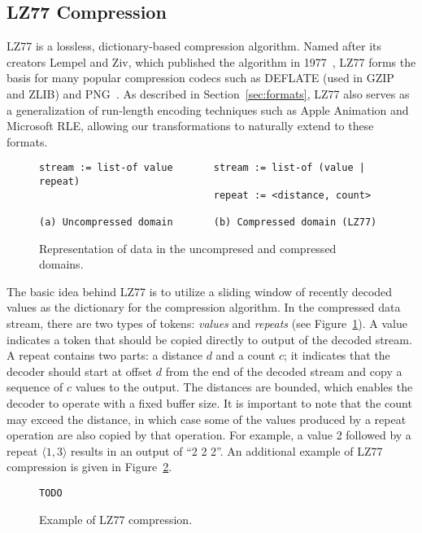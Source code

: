 \subsection{LZ77 Compression}

LZ77 is a lossless, dictionary-based compression algorithm.  Named
after its creators Lempel and Ziv, which published the algorithm in
1977~\cite{lz77}, LZ77 forms the basis for many popular compression
codecs such as DEFLATE\cite{deflate} (used in GZIP\cite{gzip} and
ZLIB\cite{zlib}) and PNG~\cite{png}.  As described in
Section~\ref{sec:formats}, LZ77 also serves as a generalization of
run-length encoding techniques such as Apple Animation and Microsoft
RLE, allowing our transformations to naturally extend to these
formats.

\begin{figure}[t]
\scriptsize
\begin{verbatim}
stream := list-of value       stream := list-of (value | repeat)
                              repeat := <distance, count>

(a) Uncompressed domain       (b) Compressed domain (LZ77)
\end{verbatim}
\caption{Representation of data in the uncompresed and compressed
domains.  \protect\label{fig:domains}}
\end{figure}

The basic idea behind LZ77 is to utilize a sliding window of recently
decoded values as the dictionary for the compression algorithm.  In
the compressed data stream, there are two types of tokens: {\it
values} and {\it repeats} (see Figure~\ref{fig:domains}).  A value
indicates a token that should be copied directly to output of the
decoded stream.  A repeat contains two parts: a distance $d$ and a
count $c$; it indicates that the decoder should start at offset $d$
from the end of the decoded stream and copy a sequence of $c$ values
to the output.  The distances are bounded, which enables the decoder
to operate with a fixed buffer size.  It is important to note that the
count may exceed the distance, in which case some of the values
produced by a repeat operation are also copied by that operation.  For
example, a value 2 followed by a repeat $\langle1, 3\rangle$ results
in an output of ``2 2 2''.  An additional example of LZ77 compression
is given in Figure~\ref{fig:lz77}.

\begin{figure}[t]
\scriptsize
\begin{verbatim}
TODO
\end{verbatim}
\caption{Example of LZ77 compression.
\protect\label{fig:lz77}}
\end{figure}

